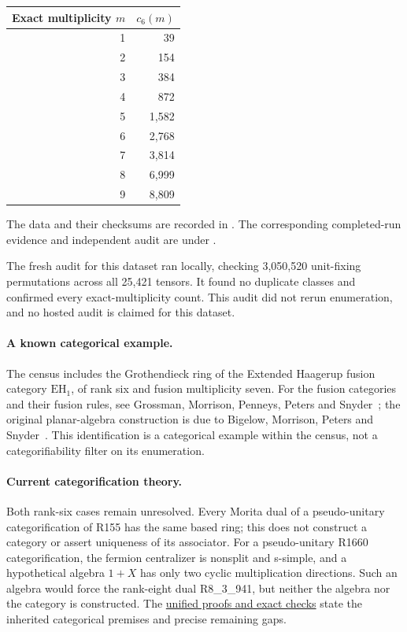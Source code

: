\documentclass[11pt,a4paper]{article}
\theoremstyle{definition}\newtheorem{definition}[theorem]{Definition}\newtheorem{remark}[theorem]{Remark}
\newcommand{\Rank}{6}
\begin{document}
\begin{center}\begin{tabular}{rr}\toprule Exact multiplicity $m$ & $c_{\Rank}(m)$\\\midrule
1 & 39\\
2 & 154\\
3 & 384\\
4 & 872\\
5 & 1,582\\
6 & 2,768\\
7 & 3,814\\
8 & 6,999\\
9 & 8,809\\
\bottomrule\end{tabular}\end{center}

The data and their checksums are recorded in . The corresponding completed-run evidence and independent audit are under .

The fresh audit for this dataset ran locally, checking 3,050,520 unit-fixing permutations across all 25,421 tensors. It found no duplicate classes and confirmed every exact-multiplicity count. This audit did not rerun enumeration, and no hosted audit is claimed for this dataset.

\paragraph{A known categorical example.}
The census includes the Grothendieck ring of the Extended Haagerup fusion
category $\mathrm{EH}_1$, of rank six and fusion multiplicity seven.
For the fusion categories and their fusion rules, see Grossman, Morrison,
Penneys, Peters and Snyder~\cite{GMPPS}; the original planar-algebra
construction is due to Bigelow, Morrison, Peters and Snyder~\cite{BMPS}.
This identification is a categorical example within the census, not a
categorifiability filter on its enumeration.
\paragraph{Current categorification theory.}
Both rank-six cases remain unresolved. Every Morita dual of a pseudo-unitary
categorification of R155 has the same based ring; this does not construct a
category or assert uniqueness of its associator. For a pseudo-unitary
R1660 categorification, the fermion centralizer is nonsplit and s-simple,
and a hypothetical algebra $1+X$ has
only two cyclic multiplication directions. Such an algebra would force the
rank-eight dual R8\_3\_941, but neither the algebra nor the category is
constructed. The
\href{https://github.com/sebastienpalcoux/grothendieck-ring-classification/blob/main/evidence/frontier/README.md}{unified proofs and exact checks}
state the inherited categorical premises and precise remaining gaps.
\end{document}
